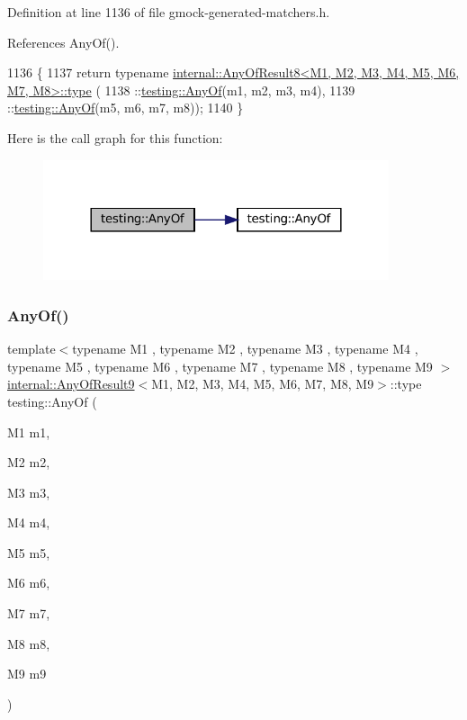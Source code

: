 Definition at line 1136 of file gmock-\/generated-\/matchers.\+h.



References Any\+Of().


\begin{DoxyCode}
1136                                                               \{
1137   \textcolor{keywordflow}{return} \textcolor{keyword}{typename} \hyperlink{namespacegenerate__debs_a50bc9a7ecac9584553e089a448bcde58}{internal::AnyOfResult8<M1, M2, M3, M4, M5, M6, M7, M8>::type}
      (
1138       ::\hyperlink{namespacetesting_a81cfefd9f75cdce827d5bc873cf73aac}{testing::AnyOf}(m1, m2, m3, m4),
1139       ::\hyperlink{namespacetesting_a81cfefd9f75cdce827d5bc873cf73aac}{testing::AnyOf}(m5, m6, m7, m8));
1140 \}
\end{DoxyCode}
Here is the call graph for this function\+:
\nopagebreak
\begin{figure}[H]
\begin{center}
\leavevmode
\includegraphics[width=288pt]{namespacetesting_a9c979c62cc004664b14e0ce444e531d5_cgraph}
\end{center}
\end{figure}
\mbox{\label{namespacetesting_a873c812db953aebd4bf2ffbff0e8d770}} 
\subsubsection{\texorpdfstring{Any\+Of()}{AnyOf()}\hspace{0.1cm}{\footnotesize\ttfamily [8/9]}}
{\footnotesize\ttfamily template$<$typename M1 , typename M2 , typename M3 , typename M4 , typename M5 , typename M6 , typename M7 , typename M8 , typename M9 $>$ \\
\hyperlink{structtesting_1_1internal_1_1AnyOfResult9}{internal\+::\+Any\+Of\+Result9}$<$M1, M2, M3, M4, M5, M6, M7, M8, M9$>$\+::type testing\+::\+Any\+Of (\begin{DoxyParamCaption}\item[{M1}]{m1,  }\item[{M2}]{m2,  }\item[{M3}]{m3,  }\item[{M4}]{m4,  }\item[{M5}]{m5,  }\item[{M6}]{m6,  }\item[{M7}]{m7,  }\item[{M8}]{m8,  }\item[{M9}]{m9 }\end{DoxyParamCaption})\hspace{0.3cm}{\ttfamily [inline]}}



